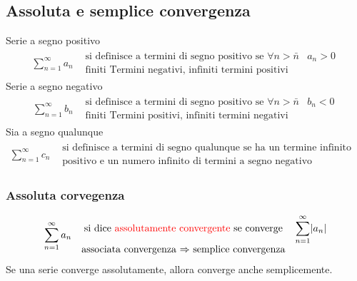 \subsection{Assoluta e semplice convergenza}
Serie a segno positivo
\begin{equation*}
	\begin{matrix}
		\displaystyle\sum_{n=1}^{\infty} a_n& \begin{matrix}
			\text{si definisce a termini di segno positivo se } \forall n>
			\bar{n} &a_n>0\\
			\text{finiti Termini negativi, infiniti termini positivi}
		\end{matrix}
	\end{matrix}
\end{equation*}
Serie a segno negativo
\begin{equation*}
	\begin{matrix}
		\displaystyle\sum_{n=1}^{\infty} b_n& \begin{matrix}
			\text{si definisce a termini di segno positivo se } \forall n>
			\bar{n} &b_n<0\\
			\text{finiti Termini positivi, infiniti termini negativi}
		\end{matrix}
	\end{matrix}
\end{equation*}
Sia a segno qualunque
\begin{equation*}
	\begin{matrix}
		\displaystyle\sum_{n=1}^{\infty} c_n& \begin{matrix}
			\text{si definisce a termini di segno qualunque se ha un termine
			infinito di termini a segno}\\
			\text{positivo e un numero infinito di termini a segno negativo}
		\end{matrix}
	\end{matrix}
\end{equation*}
\subsubsection{Assoluta corvegenza}
\begin{equation*}
	\begin{matrix}
		\displaystyle\sum_{n=1}^{\infty} a_n& \begin{matrix}
			\text{si dice {\color{red}assolutamente convergente} se converge} &
			\displaystyle\sum_{n=1}^{\infty} \lvert a_n\rvert\\
			\text{associata convergenza $\Rightarrow$ semplice convergenza} 
		\end{matrix}
	\end{matrix}
\end{equation*}
Se una serie converge assolutamente, allora converge anche semplicemente.

